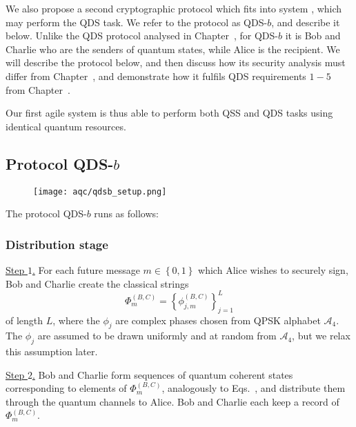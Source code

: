 We also propose a second cryptographic protocol which fits into system \systemB, which may perform the QDS task. We refer to the protocol as QDS-$b$, and describe it below. Unlike the QDS protocol analysed in Chapter~, for QDS-$b$ it is Bob and Charlie who are the senders of quantum states, while Alice is the recipient. We will describe the protocol below, and then discuss how its security analysis must differ from Chapter~, and demonstrate how it fulfils QDS requirements $1-5$ from Chapter~.

Our first agile system \systemB is thus able to perform both QSS and QDS tasks using identical quantum resources. 

\subsection{Protocol QDS-$b$}


\begin{figure}[htp]
\centering
\texttt{[image: aqc/qdsb\_setup.png]}
\caption{\label{fig:qdsb_setup}}
\end{figure}

The protocol QDS-$b$ runs as follows:

\subsubsection*{Distribution stage}

\noindent \underline{Step $1$.} For each future message $m \in \left\{0, 1\right\}$ which Alice wishes to securely sign, Bob and Charlie create the classical strings
\begin{equation}
\Phi_m^{\left(B, C\right)} = \left\{\phi_{j, m}^{\left(B, C\right)}\right\}_{j=1}^L
\end{equation}
of length $L$, where the $\phi_j$ are complex phases chosen from QPSK alphabet $\mathcal{A}_4$. The $\phi_j$ are assumed to be drawn uniformly and at random from $\mathcal{A}_4$, but we relax this assumption later. 


\noindent \underline{Step $2$.} Bob and Charlie form sequences of quantum coherent states corresponding to elements of $\Phi_m^{\left(B, C\right)}$, analogously to Eqs.~, and distribute them through the quantum channels to Alice. Bob and Charlie each keep a record of $\Phi_m^{\left(B, C\right)}$.

